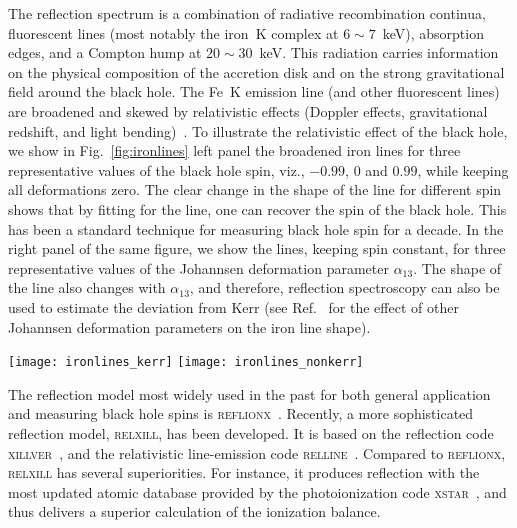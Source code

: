 \documentclass[11pt,a4paper,pdftex]{article}
\begin{document}
The reflection spectrum is a combination of radiative recombination continua, fluorescent lines (most notably the iron~K complex at $6\sim7$~keV), absorption edges, and a Compton hump at $20\sim30$~keV. This radiation carries information on the physical composition of the accretion disk and on the strong gravitational field around the black hole. The Fe~K emission line (and other fluorescent lines) are broadened and skewed by relativistic effects (Doppler effects, gravitational redshift, and light bending)~\cite{Fabian:1989ej,Laor:1991nc}. To illustrate the relativistic effect of the black hole, we show in Fig.~\ref{fig:ironlines} left panel the broadened iron lines for three representative values of the black hole spin, viz., $-0.99$, 0 and $0.99$, while keeping all deformations zero. The clear change in the shape of the line for different spin shows that  by fitting for the line, one can recover the spin of the black hole. This has been a standard technique for measuring black hole spin for a decade. In the right panel of the same figure, we show the lines, keeping spin constant, for three representative values of the Johannsen deformation parameter $\alpha_{13}$. The shape of the line also changes with $\alpha_{13}$, and therefore, reflection spectroscopy can also be used to estimate the deviation from Kerr (see Ref.~\cite{bambi2016} for the effect of other Johannsen deformation parameters on the iron line shape).


\begin{figure*}%
\begin{center}
\texttt{[image: ironlines\_kerr]} 
\hspace{0.5cm}
\texttt{[image: ironlines\_nonkerr]}
\end{center}
\vspace{-0.4cm}
\caption{Normalized flux plotted as a function of energy at the observer using {\sc relline\_nk}. The left figure plots Kerr cases, with the labels indicating the value of $a_*$, while the right figure plots non-Kerr cases at a fixed $a_*=0.9$, with the labels denoting the value of $\alpha_{13}$. Inclination is fixed in both cases at $45^{\circ}$. \label{fig:ironlines}}
\end{figure*}


The reflection model most widely used in the past for both general application and measuring black hole spins is \textsc{reflionx}~\cite{Ross:2005dm}. Recently, a more sophisticated reflection model, \textsc{relxill}, has been developed. It is based on the reflection code \textsc{xillver}~\cite{garcia2011x,garcia2013x,garcia2014improved}, and the relativistic line-emission code \textsc{relline}~\cite{dauser2010broad,dauser2013irradiation,dauser2014role}. Compared to \textsc{reflionx}, \textsc{relxill} has several superiorities. For instance, it produces reflection with the most updated atomic database provided by the photoionization code \textsc{xstar}~\cite{kallman2001photoionization}, and thus delivers a superior calculation of the ionization balance. 
\end{document}
